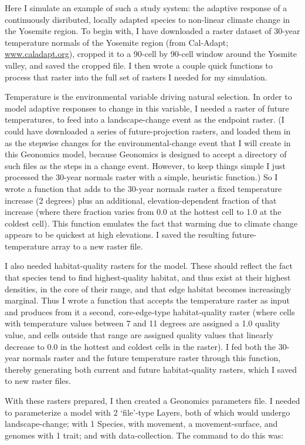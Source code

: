 ﻿\documentclass{article}
\begin{document}
Here I simulate an example of such a study system: the adaptive
response of a continuously disributed, locally adapted species
to non-linear climate change in the Yosemite region. To begin with, I have
downloaded a raster dataset of 30-year temperature normals of the Yosemite
region (from Cal-Adapt; \url{www.caladapt.org}), cropped it to a 90-cell by
90-cell window around the Yosmite valley, and saved the cropped file. I then
wrote a couple quick functions to process that raster into the full set of
rasters I needed for my simulation.

Temperature is the environmental variable driving natural selection.
In order to model adaptive responses to change in this variable, I needed
a raster of future temperatures, to feed into a landscape-change event
as the endpoint raster.
(I could have downloaded a series of future-projection rasters, and loaded
them in as the stepwise changes for the environmental-change event that I will
create in this Geonomics model, because Geonomics is designed to accept a
directory of such files as the steps in a change event. However, to keep
things simple I just processed the 30-year normals raster with a simple,
heuristic function.) So I wrote a function that adds to the 30-year normals
raster a fixed temperature increase (2 degrees) plus an additional,
elevation-dependent fraction of that increase (where there fraction varies
from 0.0 at the hottest cell to 1.0 at the coldest cell). This function
emulates the fact that warming due to climate change appears to be quickest
at high elevations. I saved the resulting future-temperature array to a new
raster file.

I also needed habitat-quality rasters for the model. These should reflect
the fact that species tend to find highest-quality habitat, and thus exist at
their highest densities, in the core of their range, and that edge habitat
becomes increasingly marginal. Thus I wrote a function that accepts the
temperature raster as input and produces from
it a second, core-edge-type habitat-quality raster (where cells with
temperature values between 7 and 11 degrees are assigned a 1.0 quality value,
and cells outside that range are assigned quality values that linearly decrease
to 0.0 in the hottest and coldest cells in the raster). I fed both the 30-year
normals raster and the future temperature raster through this function, thereby
generating both current and future habitat-quality rasters, which I saved to
new raster files.

With these rasters prepared, I then created a Geonomics parameters file.
I needed to parameterize a model with 2 `file'-type Layers,
both of which would undergo landscape-change;
with 1 Species, with movement, a movement-surface, and
genomes with 1 trait; and with data-collection.
The command to do this was:
\end{document}
